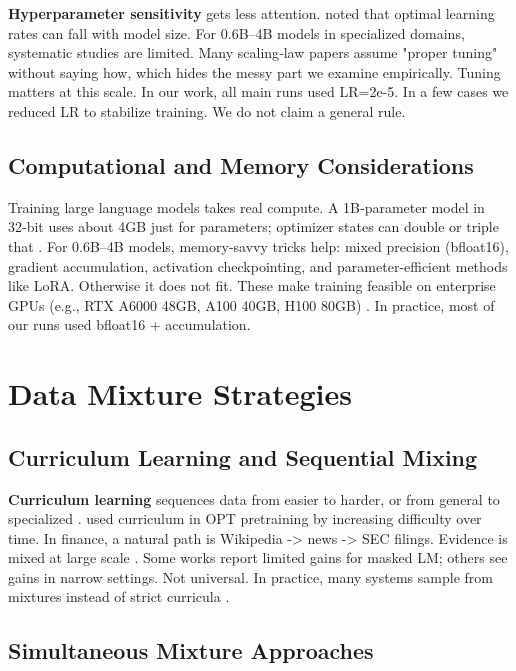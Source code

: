 \textbf{Hyperparameter sensitivity} gets less attention. \textcite{mccandlish2018empirical} noted that optimal learning rates can fall with model size. For 0.6B--4B models in specialized domains, systematic studies are limited. Many scaling‑law papers assume "proper tuning" without saying how, which hides the messy part we examine empirically. Tuning matters at this scale. In our work, all main runs used LR=2e-5. In a few cases we reduced LR to stabilize training. We do not claim a general rule.

\subsection{Computational and Memory Considerations}

Training large language models takes real compute. A 1B‑parameter model in 32‑bit uses about 4GB just for parameters; optimizer states can double or triple that \parencite{rajbhandari2020zero,kingma2014adam}. For 0.6B--4B models, memory‑savvy tricks help: mixed precision (bfloat16), gradient accumulation, activation checkpointing, and parameter‑efficient methods like LoRA. Otherwise it does not fit. These make training feasible on enterprise GPUs (e.g., RTX A6000 48GB, A100 40GB, H100 80GB) \parencite{narayanan2021efficient,hu2021lora}. In practice, most of our runs used bfloat16 + accumulation.

\section{Data Mixture Strategies}

\subsection{Curriculum Learning and Sequential Mixing}

\textbf{Curriculum learning} sequences data from easier to harder, or from general to specialized \parencite{bengio2009curriculum}. \textcite{wu2022opt} used curriculum in OPT pretraining by increasing difficulty over time. In finance, a natural path is Wikipedia -> news -> SEC filings. Evidence is mixed at large scale \parencite{longpre2023pretrainer}. Some works report limited gains for masked LM; others see gains in narrow settings. Not universal. In practice, many systems sample from mixtures instead of strict curricula \parencite{raffel2020exploring,wu2022opt}.

\subsection{Simultaneous Mixture Approaches}

